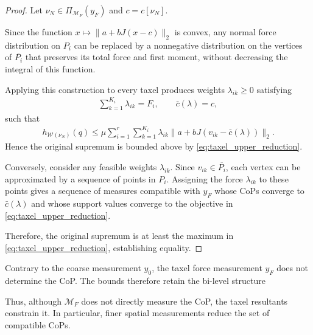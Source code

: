 \documentclass[11pt,a4paper]{article}
\theoremstyle{proposition}
\begin{document}
\begin{proof}
    Let $\nu_N\in\Pi_{\mathcal M_F}(y_F)$ and
    $c=c[\nu_N]$.

    Since the function
    $x\mapsto\|a+bJ(x-c)\|_2$ is convex,
    any normal force distribution on $P_i$ can be
    replaced by a nonnegative distribution on the
    vertices of $\overline{P_i}$ that preserves its
    total force and first moment, without decreasing
    the integral of this function.

    Applying this construction to every taxel
    produces weights $\lambda_{ik}\geq0$ satisfying
    \begin{align}
        \sum_{k=1}^{K_i}\lambda_{ik}=F_i,
        \qquad
        \bar c(\lambda)=c,
    \end{align}
    such that
    \begin{align}
        h_{\mathcal W(\nu_N)}(q)
        \leq
        \mu\sum_{i=1}^r\sum_{k=1}^{K_i}
        \lambda_{ik}
        \|a+bJ(v_{ik}-\bar c(\lambda))\|_2.
    \end{align}
    Hence the original supremum is bounded above by
    \eqref{eq:taxel_upper_reduction}.

    Conversely, consider any feasible weights
    $\lambda_{ik}$. Since
    $v_{ik}\in\overline{P_i}$, each vertex can be
    approximated by a sequence of points in $P_i$.
    Assigning the force $\lambda_{ik}$ to these
    points gives a sequence of measures compatible
    with $y_F$ whose CoPs converge to $\bar c(\lambda)$
    and whose support values converge to the
    objective in \eqref{eq:taxel_upper_reduction}.

    Therefore, the original supremum is at least the
    maximum in \eqref{eq:taxel_upper_reduction},
    establishing equality.
\end{proof}

Contrary to the coarse measurement $y_0$, the taxel force measurement $y_F$ does not determine the CoP. The bounds therefore retain the bi-level structure


Thus, although $\mathcal M_F$ does not directly measure the CoP, the taxel
resultants constrain it. In particular, finer spatial measurements reduce the
set of compatible CoPs.
\end{document}
